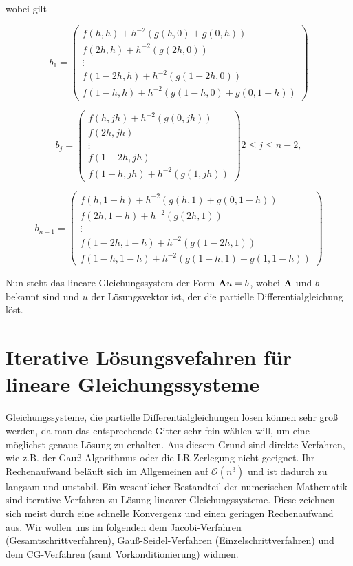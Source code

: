 wobei gilt

\begin{equation}
b_{1} = 
\begin{pmatrix}
f(h,h) + h^{-2}(g(h,0)+g(0,h)) \\
f(2h,h) + h^{-2}(g(2h,0)) \\
\vdots \\
f(1-2h,h) + h^{-2}(g(1-2h,0)) \\
f(1-h,h) + h^{-2}(g(1-h,0)+g(0,1-h))
\end{pmatrix}
\end{equation}

\begin{equation}
b_{j} = 
\begin{pmatrix}
f(h,jh) + h^{-2}(g(0,jh)) \\
f(2h,jh) \\
\vdots \\
f(1-2h,jh) \\
f(1-h,jh) + h^{-2}(g(1,jh))
\end{pmatrix}
2 \le j \le n-2,
\end{equation}

\begin{equation}
b_{n-1} = 
\begin{pmatrix}
f(h,1-h) + h^{-2}(g(h,1)+g(0,1-h)) \\
f(2h,1-h) + h^{-2}(g(2h,1)) \\
\vdots \\
f(1-2h,1-h) + h^{-2}(g(1-2h,1)) \\
f(1-h,1-h) + h^{-2}(g(1-h,1)+g(1,1-h))
\end{pmatrix}
\end{equation}

Nun steht das lineare Gleichungssystem der Form ${\textbf{A}}u = b$, wobei ${\textbf{A}}$ und $b$ bekannt sind und $u$ der Lösungsvektor ist, der die partielle Differentialgleichung löst.

\chapter{Iterative Lösungsvefahren für lineare Gleichungssysteme}\label{c.IterativeVerfahren}

Gleichungssysteme, die partielle Differentialgleichungen lösen können sehr groß werden, da man das entsprechende Gitter sehr fein wählen will, um eine möglichst genaue Lösung zu erhalten. Aus diesem Grund sind direkte Verfahren, wie z.B. der Gauß-Algorithmus oder die LR-Zerlegung nicht geeignet. Ihr Rechenaufwand beläuft sich im Allgemeinen auf $\mathcal{O}(n^{3})$ und ist dadurch zu langsam und unstabil. Ein wesentlicher Bestandteil der numerischen Mathematik sind iterative Verfahren zu Lösung linearer Gleichungssysteme. Diese zeichnen sich meist durch eine schnelle Konvergenz und einen geringen Rechenaufwand aus. Wir wollen uns im folgenden dem Jacobi-Verfahren (Gesamtschrittverfahren), Gauß-Seidel-Verfahren (Einzelschrittverfahren) und dem CG-Verfahren (samt Vorkonditionierung) widmen.

